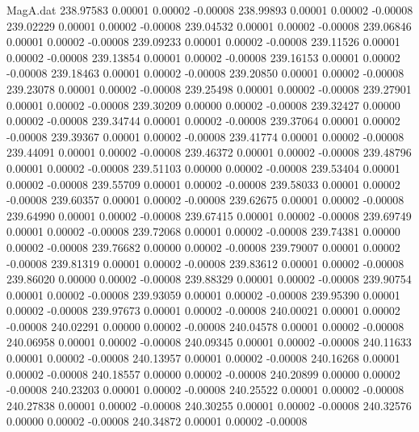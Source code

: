 \begin{filecontents}{MagA.dat}
 238.97583    0.00001    0.00002   -0.00008
 238.99893    0.00001    0.00002   -0.00008
 239.02229    0.00001    0.00002   -0.00008
 239.04532    0.00001    0.00002   -0.00008
 239.06846    0.00001    0.00002   -0.00008
 239.09233    0.00001    0.00002   -0.00008
 239.11526    0.00001    0.00002   -0.00008
 239.13854    0.00001    0.00002   -0.00008
 239.16153    0.00001    0.00002   -0.00008
 239.18463    0.00001    0.00002   -0.00008
 239.20850    0.00001    0.00002   -0.00008
 239.23078    0.00001    0.00002   -0.00008
 239.25498    0.00001    0.00002   -0.00008
 239.27901    0.00001    0.00002   -0.00008
 239.30209    0.00000    0.00002   -0.00008
 239.32427    0.00000    0.00002   -0.00008
 239.34744    0.00001    0.00002   -0.00008
 239.37064    0.00001    0.00002   -0.00008
 239.39367    0.00001    0.00002   -0.00008
 239.41774    0.00001    0.00002   -0.00008
 239.44091    0.00001    0.00002   -0.00008
 239.46372    0.00001    0.00002   -0.00008
 239.48796    0.00001    0.00002   -0.00008
 239.51103    0.00000    0.00002   -0.00008
 239.53404    0.00001    0.00002   -0.00008
 239.55709    0.00001    0.00002   -0.00008
 239.58033    0.00001    0.00002   -0.00008
 239.60357    0.00001    0.00002   -0.00008
 239.62675    0.00001    0.00002   -0.00008
 239.64990    0.00001    0.00002   -0.00008
 239.67415    0.00001    0.00002   -0.00008
 239.69749    0.00001    0.00002   -0.00008
 239.72068    0.00001    0.00002   -0.00008
 239.74381    0.00000    0.00002   -0.00008
 239.76682    0.00000    0.00002   -0.00008
 239.79007    0.00001    0.00002   -0.00008
 239.81319    0.00001    0.00002   -0.00008
 239.83612    0.00001    0.00002   -0.00008
 239.86020    0.00000    0.00002   -0.00008
 239.88329    0.00001    0.00002   -0.00008
 239.90754    0.00001    0.00002   -0.00008
 239.93059    0.00001    0.00002   -0.00008
 239.95390    0.00001    0.00002   -0.00008
 239.97673    0.00001    0.00002   -0.00008
 240.00021    0.00001    0.00002   -0.00008
 240.02291    0.00000    0.00002   -0.00008
 240.04578    0.00001    0.00002   -0.00008
 240.06958    0.00001    0.00002   -0.00008
 240.09345    0.00001    0.00002   -0.00008
 240.11633    0.00001    0.00002   -0.00008
 240.13957    0.00001    0.00002   -0.00008
 240.16268    0.00001    0.00002   -0.00008
 240.18557    0.00000    0.00002   -0.00008
 240.20899    0.00000    0.00002   -0.00008
 240.23203    0.00001    0.00002   -0.00008
 240.25522    0.00001    0.00002   -0.00008
 240.27838    0.00001    0.00002   -0.00008
 240.30255    0.00001    0.00002   -0.00008
 240.32576    0.00000    0.00002   -0.00008
 240.34872    0.00001    0.00002   -0.00008

\end{filecontents}
